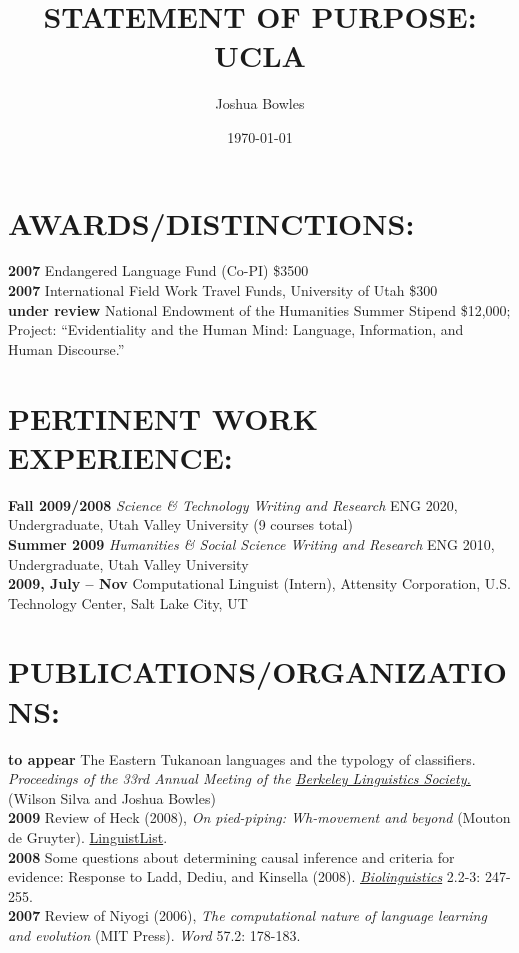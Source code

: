 \documentclass[11pt]{article}
\begin{document}
\author{Joshua Bowles}
\title{STATEMENT OF PURPOSE: UCLA}
\date{\today}



\maketitle
\section{AWARDS/DISTINCTIONS:}
\textbf{2007} Endangered Language Fund (Co-PI) \$3500\\
\textbf{2007} International Field Work Travel Funds, University of Utah \$300\\
\textbf{under review} National Endowment of the Humanities Summer Stipend \$12,000; Project: ``Evidentiality and the Human Mind: Language, Information, and Human Discourse.''

\section{PERTINENT WORK EXPERIENCE:} 
\textbf{Fall 2009/2008}	\emph{Science \& Technology Writing and Research} ENG 2020, Undergraduate, Utah Valley University (9 courses total)\\
\textbf{Summer 2009} \emph{Humanities \& Social Science Writing and Research} ENG 2010, Undergraduate, Utah Valley University\\
\textbf{2009, July -- Nov} Computational Linguist (Intern), Attensity Corporation, U.S. Technology Center, Salt Lake City, UT

\section{PUBLICATIONS/ORGANIZATIONS:}
\textbf{to appear} The Eastern Tukanoan languages and the typology of classifiers. \emph{Proceedings of the 33rd
Annual Meeting of the \href{http://linguistics.berkeley.edu/BLS/past_meetings.html}{Berkeley Linguistics Society.}} (Wilson Silva and Joshua Bowles)\\
\textbf{2009} Review of Heck (2008), \emph{On pied-piping: Wh-movement and beyond} (Mouton de Gruyter). \href{http://linguistlist.org/issues/20/20-2283.html}{LinguistList}.\\
\textbf{2008} Some questions about determining causal inference and criteria for evidence:
Response to Ladd, Dediu, and Kinsella (2008). \emph{\href{http://www.biolinguistics.eu.}{Biolinguistics}} 2.2-3: 247-255.\\
\textbf{2007} Review of Niyogi (2006), \emph{The computational nature of language learning and evolution} (MIT Press). {\it Word} 57.2: 178-183.\\
\end{document}
